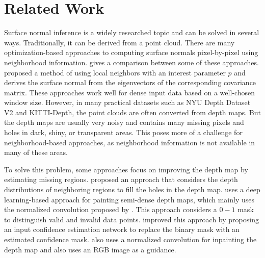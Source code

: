 
\chapter{Related Work} %

\label{ch:02} %

Surface normal inference is a widely researched topic and can be solved in several ways. Traditionally, it can be derived from a point cloud. There are many optimization-based approaches to computing surface normals pixel-by-pixel using neighborhood information. \cite{optimized-methods} gives a comparison between some of these approaches. \cite{Holzer.S} proposed a method of using local neighbors with an interest parameter $ p $ and derives the surface normal from the eigenvectors of the corresponding covariance matrix. These approaches work well for dense input data based on a well-chosen window size.
However, in many practical datasets such as NYU Depth Dataset V2 \cite{nyu} and KITTI-Depth\cite{kitti-depth}, the point clouds are often converted from depth maps.
But the depth maps are usually very noisy and contains many missing pixels and holes in dark, shiny, or transparent areas. This poses more of a challenge for neighborhood-based approaches, as neighborhood information is not available in many of these areas. 

To solve this problem, some approaches focus on improving the depth map by estimating missing regions. \cite{depth-inpainting-distribution} proposed an approach that considers the depth distributions of neighboring regions to fill the holes in the depth map. \cite{ncnn} uses a deep learning-based approach for painting semi-dense depth maps, which mainly uses the normalized convolution proposed by \cite{nconv}. This approach considers a $ 0-1 $ mask to distinguish valid and invalid data points. \cite{pncnn} improved this approach by proposing an input confidence estimation network to replace the binary mask with an estimated confidence mask. \cite{depth-enhance-guided} also uses a normalized convolution for inpainting the depth map and also uses an RGB image as a guidance. 







